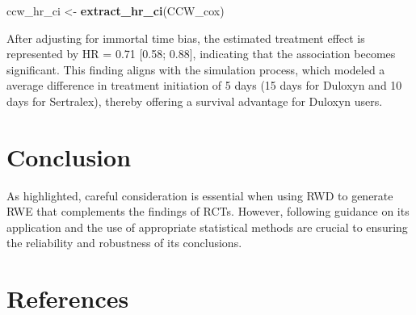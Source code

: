 \documentclass[
]{book}
\newenvironment{Shaded}{\begin{snugshade}}{\end{snugshade}}
\newcommand{\FunctionTok}[1]{\textcolor[rgb]{0.13,0.29,0.53}{\textbf{#1}}}
\newcommand{\NormalTok}[1]{#1}
\newcommand{\OtherTok}[1]{\textcolor[rgb]{0.56,0.35,0.01}{#1}}
\begin{document}
\begin{Shaded}
\begin{Highlighting}[]
\NormalTok{ccw\_hr\_ci }\OtherTok{\textless{}{-}} \FunctionTok{extract\_hr\_ci}\NormalTok{(CCW\_cox)}
\end{Highlighting}
\end{Shaded}

After adjusting for immortal time bias, the estimated treatment effect
is represented by HR = 0.71 {[}0.58; 0.88{]}, indicating that the
association becomes significant. This finding aligns with the simulation
process, which modeled a average difference in treatment initiation of 5
days (15 days for Duloxyn and 10 days for Sertralex), thereby offering a
survival advantage for Duloxyn users.

\chapter*{Conclusion}\label{conclusion}

As highlighted, careful consideration is essential when using RWD to
generate RWE that complements the findings of RCTs. However, following
guidance on its application and the use of appropriate statistical
methods are crucial to ensuring the reliability and robustness of its
conclusions.

\chapter*{References}\label{references}
\end{document}
